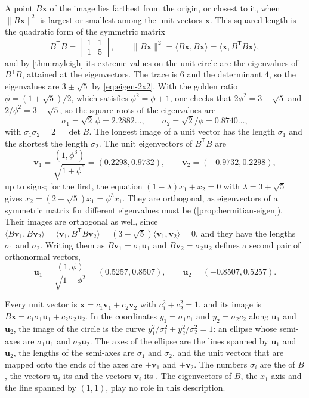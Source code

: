 A point $B\mathbf x$ of the image lies farthest from the origin, or closest to it, when $\|B\mathbf x\|^2$ is largest or smallest among the unit vectors $\mathbf x$. This squared length is the quadratic form of the symmetric matrix
\[
B^{\mathsf T}B=\begin{bmatrix}1&1\\1&5\end{bmatrix},\qquad\|B\mathbf x\|^2=\langle B\mathbf x,B\mathbf x\rangle=\langle\mathbf x,B^{\mathsf T}B\mathbf x\rangle ,
\]
and by \cref{thm:rayleigh} its extreme values on the unit circle are the eigenvalues of $B^{\mathsf T}B$, attained at the eigenvectors. The trace is $6$ and the determinant $4$, so the eigenvalues are $3\pm\sqrt5$ by \eqref{eq:eigen-2x2}. With the golden ratio $\phi=(1+\sqrt5)/2$, which satisfies $\phi^2=\phi+1$, one checks that $2\phi^2=3+\sqrt5$ and $2/\phi^2=3-\sqrt5$, so the square roots of the eigenvalues are
\[
\sigma_1=\sqrt2\,\phi=2.2882\ldots,\qquad\sigma_2=\sqrt2/\phi=0.8740\ldots,
\]
with $\sigma_1\sigma_2=2=\det B$. The longest image of a unit vector has the length $\sigma_1$ and the shortest the length $\sigma_2$. The unit eigenvectors of $B^{\mathsf T}B$ are
\[
\mathbf v_1=\frac{(1,\phi^3)}{\sqrt{1+\phi^6}}=(0.2298,0.9732),\qquad\mathbf v_2=(-0.9732,0.2298),
\]
up to signs; for the first, the equation $(1-\lambda)x_1+x_2=0$ with $\lambda=3+\sqrt5$ gives $x_2=(2+\sqrt5)x_1=\phi^3x_1$. They are orthogonal, as eigenvectors of a symmetric matrix for different eigenvalues must be (\cref{prop:hermitian-eigen}). Their images are orthogonal as well, since $\langle B\mathbf v_1,B\mathbf v_2\rangle=\langle\mathbf v_1,B^{\mathsf T}B\mathbf v_2\rangle=(3-\sqrt5)\langle\mathbf v_1,\mathbf v_2\rangle=0$, and they have the lengths $\sigma_1$ and $\sigma_2$. Writing them as $B\mathbf v_1=\sigma_1\mathbf u_1$ and $B\mathbf v_2=\sigma_2\mathbf u_2$ defines a second pair of orthonormal vectors,
\[
\mathbf u_1=\frac{(1,\phi)}{\sqrt{1+\phi^2}}=(0.5257,0.8507),\qquad\mathbf u_2=(-0.8507,0.5257).
\]

Every unit vector is $\mathbf x=c_1\mathbf v_1+c_2\mathbf v_2$ with $c_1^2+c_2^2=1$, and its image is $B\mathbf x=c_1\sigma_1\mathbf u_1+c_2\sigma_2\mathbf u_2$. In the coordinates $y_1=\sigma_1c_1$ and $y_2=\sigma_2c_2$ along $\mathbf u_1$ and $\mathbf u_2$, the image of the circle is the curve $y_1^2/\sigma_1^2+y_2^2/\sigma_2^2=1$: an ellipse whose semi-axes are $\sigma_1\mathbf u_1$ and $\sigma_2\mathbf u_2$. The axes of the ellipse are the lines spanned by $\mathbf u_1$ and $\mathbf u_2$, the lengths of the semi-axes are $\sigma_1$ and $\sigma_2$, and the unit vectors that are mapped onto the ends of the axes are $\pm\mathbf v_1$ and $\pm\mathbf v_2$. The numbers $\sigma_i$ are the  of $B$, the vectors $\mathbf u_i$ its  and the vectors $\mathbf v_i$ its . The eigenvectors of $B$, the $x_1$-axis and the line spanned by $(1,1)$, play no role in this description.

